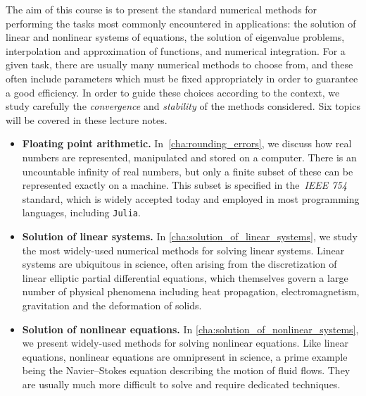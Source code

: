 The aim of this course is to present the standard numerical methods for performing the tasks most commonly encountered in applications:
the solution of linear and nonlinear systems of equations,
the solution of eigenvalue problems,
interpolation and approximation of functions,
and numerical integration.
For a given task,
there are usually many numerical methods to choose from,
and these often include parameters which must be fixed appropriately in order to guarantee a good efficiency.
In order to guide these choices according to the context,
we study carefully the \emph{convergence} and \emph{stability} of the methods considered.
Six topics will be covered in these lecture notes.
\begin{itemize}
    \item
        \textbf{Floating point arithmetic.}
        In~\cref{cha:rounding_errors},
        we discuss how real numbers are represented, manipulated and stored on a computer.
        There is an uncountable infinity of real numbers,
        but only a finite subset of these can be represented exactly on a machine.
        This subset is specified in the~\emph{IEEE 754} standard,
        which is widely accepted today and employed in most programming languages, including \texttt{Julia}.

    \item
        \textbf{Solution of linear systems.}
        In \cref{cha:solution_of_linear_systems},
        we study the most widely-used numerical methods for solving linear systems.
        Linear systems are ubiquitous in science,
        often arising from the discretization of linear elliptic partial differential equations,
        which themselves govern a large number of physical phenomena including heat propagation, electromagnetism, gravitation and the deformation of solids.

    \item
        \textbf{Solution of nonlinear equations.}
        In \cref{cha:solution_of_nonlinear_systems},
        we present widely-used methods for solving nonlinear equations.
        Like linear equations, nonlinear equations are omnipresent in science,
        a prime example being the Navier--Stokes equation describing the motion of fluid flows.
        They are usually much more difficult to solve and require dedicated techniques.


\end{itemize}
